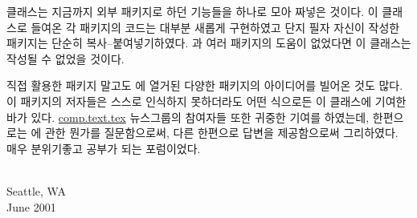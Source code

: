 %
 클래스는 지금까지 외부 패키지로 하던 기능들을 하나로 모아 짜넣은 것이다.
이 클래스로 들여온 각 패키지의 코드는 대부분 새롭게 구현하였고
단지 필자 자신이 작성한 패키지는 단순히 복사--붙여넣기하였다. 
\ltx 과 여러 패키지의 도움이 없었다면 이 클래스는 작성될 수 없었을 것이다.

%
%
직접 활용한 패키지 말고도 \bibname 에 열거된 다양한 패키지의 아이디어를 빌어온 것도 많다.
이 패키지의 저자들은 스스로 인식하지 못하더라도 어떤 식으로든 이 클래스에 기여한 바가 있다.
\url{comp.text.tex} 뉴스그룹의 참여자들 또한 귀중한 기여를 하였는데,
한편으로는 \ltx 에 관한 뭔가를 질문함으로써, 다른 한편으로 답변을 제공함으로써 그리하였다.
매우 분위기좋고 공부가 되는 포럼이었다.


{ \\ Seattle, WA \\ June 2001\par}


